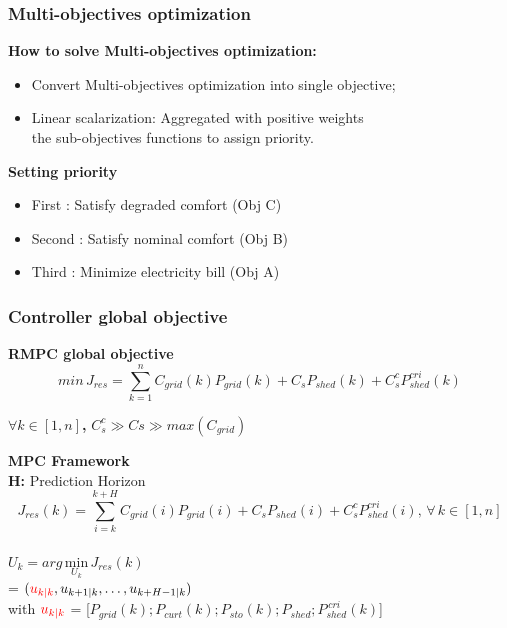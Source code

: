 \documentclass{beamer}
\begin{document}
\begingroup
\fontsize{10}{11}\selectfont
\begin{frame}
\frametitle{Multi-objectives optimization}
\textbf{How to solve Multi-objectives optimization:}  
\begin{itemize}
    \item Convert Multi-objectives optimization into single objective;
    \item Linear scalarization: Aggregated with positive weights \\the sub-objectives functions to assign priority.
\end{itemize} \vspace{8px}

\textbf{Setting priority}
\begin{itemize}
    \item First : Satisfy degraded comfort (Obj C)
    \item Second : Satisfy nominal comfort (Obj B)
    \item Third : Minimize electricity bill (Obj A)
\end{itemize}\vspace{8px}

\end{frame}
\endgroup

\begin{frame}
\frametitle{Controller global objective}
\vspace{-10px}\textbf{RMPC global objective} \vspace{-10px}
$$min \,J_{res} = \sum_{k=1}^{n} C_{grid}(k)P_{grid}(k) + C_s P_{shed}(k) + C_s^c P_{shed}^{cri}(k)$$

\textbf{$\forall k \in [1, n]$,} $C_s^c  \gg  Cs \gg max (C_{grid})$\\\vspace{12px}

\pause 
\textbf{MPC Framework}\\
\quad\textbf{H: }Prediction Horizon
\vspace{-5px}
$$J_{res}(k) = \sum_{i=k}^{k+H} C_{grid}(i)P_{grid}(i) + C_s P_{shed}(i) + C_s^c P_{shed}^{cri}(i),\, \forall \, k \in [1, n] $$ \\
\vspace{-7px}\hspace{11.6mm}$U_{k} = arg\,\underset{U_k}{\text{min}}\,J_{res}(k)$\\
\hspace{49px}= $(\textcolor{red}{u_{k|k}}, u_{k+1|k},\ldots,u_{k+H-1|k})$\\\vspace{10px}
\pause
\hspace{4px}with $\textcolor{red}{u_{k|k}}$ = [$P_{grid}(k);P_{curt}(k);P_{sto}(k);P_{shed};P_{shed}^{\,cri}(k)$]


\end{frame}
\end{document}
